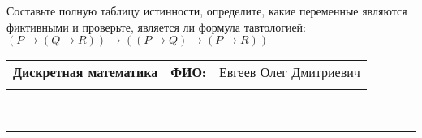 \documentclass[10pt]{exam}
\newcommand{\class}{Дискретная математика}
\newcommand{\examdate}{}
\begin{document}
\begin{questions}
\begin{enumerate} [a)]
\end{enumerate}\question Составьте полную таблицу истинности, определите, какие переменные являются фиктивными и проверьте, является ли формула тавтологией:
$(P \rightarrow (Q \rightarrow R)) \rightarrow ((P \rightarrow Q) \rightarrow (P \rightarrow R))$

\end{questions}
\newpage
\begin{flushright}
\begin{tabular}{p{2.8in} r l}
\textbf{\class} & \textbf{ФИО:} &Евгеев Олег Дмитриевич
\\

\textbf{\examdate} &&\\
\end{tabular}\\
\end{flushright}
\rule[1ex]{\textwidth}{.1pt}
\end{document}
